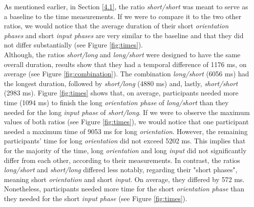 As mentioned earlier, in Section \ref{4.1}, the ratio \textit{short/short} was meant to serve as a baseline to the time measurements. If we were to compare it to the two other ratios, we would notice that the average duration of their short \textit{orientation phases} and short \textit{input phases} are very similar to the baseline and that they did not differ substantially (see Figure \ref{fig:times}).  \\

Although, the ratios \textit{short/long} and \textit{long/short} were designed to have the same overall duration, results show that they had a temporal difference of 1176 ms, on average (see Figure \ref{fig:combination}). The combination \textit{long/short} (6056 ms) had the longest duration, followed by \textit{short/long} (4880 ms) and, lastly, \textit{short/short} (2983 ms). Figure \ref{fig:times} shows that, on average, participants needed more time (1094 ms) to finish the long \textit{orientation phase} of \textit{long/short} than they needed for the long \textit{input phase} of \textit{short/long}. If we were to observe the maximum values of both ratios (see Figure \ref{fig:times}), we would notice that one participant needed a maximum time of 9053 ms for long \textit{orientation}. However, the remaining participants' time for long \textit{orientation} did not exceed 5202 ms. This implies that for the majority of the time, long \textit{orientation} and long \textit{input} did not significantly differ from each other, according to their measurements. 
In contrast, the ratios \textit{long/short} and \textit{short/long} differed less notably, regarding their "short phases", meaning short \textit{orientation} and short \textit{input}. On average, they differed by 572 ms. Nonetheless, participants needed more time for the short \textit{orientation phase} than they needed for the short \textit{input phase} (see Figure \ref{fig:times}).

